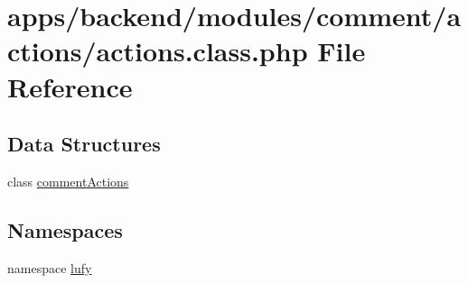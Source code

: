 \hypertarget{backend_2modules_2comment_2actions_2actions_8class_8php}{\section{apps/backend/modules/comment/actions/actions.class.\-php File Reference}
\label{backend_2modules_2comment_2actions_2actions_8class_8php}
}
\subsection*{Data Structures}
\begin{DoxyCompactItemize}
\item 
class \hyperlink{classcomment_actions}{comment\-Actions}
\end{DoxyCompactItemize}
\subsection*{Namespaces}
\begin{DoxyCompactItemize}
\item 
namespace \hyperlink{namespacelufy}{lufy}
\end{DoxyCompactItemize}
